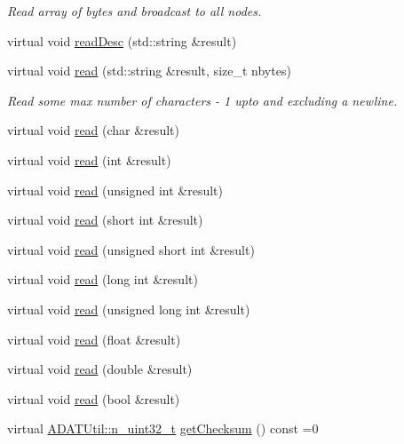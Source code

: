 \begin{DoxyCompactItemize}
\begin{DoxyCompactList}\small\item\em Read array of bytes and broadcast to all nodes. \end{DoxyCompactList}\item 
virtual void \mbox{\hyperlink{classADATIO_1_1BinaryReader_a70de2f31f59d9846f4ee688c3590bf31}{read\+Desc}} (std\+::string \&result)
\item 
virtual void \mbox{\hyperlink{classADATIO_1_1BinaryReader_a4d79cabea18fccc818eaf2c45ed21b1f}{read}} (std\+::string \&result, size\+\_\+t nbytes)
\begin{DoxyCompactList}\small\item\em Read some max number of characters -\/ 1 upto and excluding a newline. \end{DoxyCompactList}\item 
virtual void \mbox{\hyperlink{classADATIO_1_1BinaryReader_a04c653824b3819b4b02ea5eed6fd57f5}{read}} (char \&result)
\item 
virtual void \mbox{\hyperlink{classADATIO_1_1BinaryReader_a865909a3033e753939e5d634a8fbff05}{read}} (int \&result)
\item 
virtual void \mbox{\hyperlink{classADATIO_1_1BinaryReader_ac8fdf69d46dd08e49c676202927247a4}{read}} (unsigned int \&result)
\item 
virtual void \mbox{\hyperlink{classADATIO_1_1BinaryReader_acd797e0f037099dc050f4444b13179be}{read}} (short int \&result)
\item 
virtual void \mbox{\hyperlink{classADATIO_1_1BinaryReader_a02af26ba1942510d3b9510253945b346}{read}} (unsigned short int \&result)
\item 
virtual void \mbox{\hyperlink{classADATIO_1_1BinaryReader_a5b0788893198274f244f3f04384af660}{read}} (long int \&result)
\item 
virtual void \mbox{\hyperlink{classADATIO_1_1BinaryReader_ae488df4a515666e5516d5a3c30d28f08}{read}} (unsigned long int \&result)
\item 
virtual void \mbox{\hyperlink{classADATIO_1_1BinaryReader_aa9a2094a98b7786a69a9b051b1f5d81a}{read}} (float \&result)
\item 
virtual void \mbox{\hyperlink{classADATIO_1_1BinaryReader_a20d0ff738cbb83d0b266a38c7e5466be}{read}} (double \&result)
\item 
virtual void \mbox{\hyperlink{classADATIO_1_1BinaryReader_a2239e093aff4d32cd3d717a7178d121a}{read}} (bool \&result)
\item 
virtual \mbox{\hyperlink{namespaceADATUtil_ad945a8afa4db2d1f89b731964adae97e}{A\+D\+A\+T\+Util\+::n\+\_\+uint32\+\_\+t}} \mbox{\hyperlink{classADATIO_1_1BinaryReader_acd705bb96d557a5437410b55beb40bda}{get\+Checksum}} () const =0

\end{DoxyCompactItemize}
